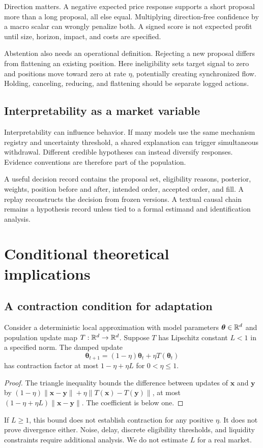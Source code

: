 Direction matters. A negative expected price response supports a short proposal more than a long proposal, all else equal. Multiplying direction-free confidence by a macro scalar can wrongly penalize both. A signed score is not expected profit until size, horizon, impact, and costs are specified.

Abstention also needs an operational definition. Rejecting a new proposal differs from flattening an existing position. Here ineligibility sets target signal to zero and positions move toward zero at rate $\eta$, potentially creating synchronized flow. Holding, canceling, reducing, and flattening should be separate logged actions.

\subsection{Interpretability as a market variable}
Interpretability can influence behavior. If many models use the same mechanism registry and uncertainty threshold, a shared explanation can trigger simultaneous withdrawal. Different credible hypotheses can instead diversify responses. Evidence conventions are therefore part of the population.

A useful decision record contains the proposal set, eligibility reasons, posterior, weights, position before and after, intended order, accepted order, and fill. A replay reconstructs the decision from frozen versions. A textual causal chain remains a hypothesis record unless tied to a formal estimand and identification analysis.


\section{Conditional theoretical implications}
\subsection{A contraction condition for adaptation}
Consider a deterministic local approximation with model parameters $\boldsymbol\theta\in\mathbb R^d$ and population update map $T:\mathbb R^d\to\mathbb R^d$. Suppose $T$ has Lipschitz constant $L<1$ in a specified norm. The damped update
\[
\boldsymbol\theta_{t+1}=(1-\eta)\boldsymbol\theta_t+\eta T(\boldsymbol\theta_t)
\]
has contraction factor at most $1-\eta+\eta L$ for $0<\eta\le1$.
\begin{proof}
The triangle inequality bounds the difference between updates of $\mathbf x$ and $\mathbf y$ by $(1-\eta)\|\mathbf x-\mathbf y\|+\eta\|T(\mathbf x)-T(\mathbf y)\|$, at most $(1-\eta+\eta L)\|\mathbf x-\mathbf y\|$. The coefficient is below one.
\end{proof}
If $L\ge1$, this bound does not establish contraction for any positive $\eta$. It does not prove divergence either. Noise, delay, discrete eligibility thresholds, and liquidity constraints require additional analysis. We do not estimate $L$ for a real market.

